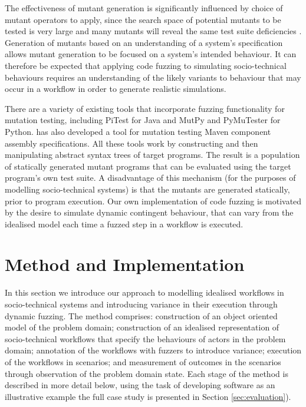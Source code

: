 \documentclass{sig-alternate}
\begin{document}
The effectiveness of mutant generation is significantly influenced by choice of
mutant operators to apply, since the search space of potential mutants to be
tested is very large and many mutants will reveal the same test suite
deficiencies \citep{takanen08fuzzing}.  Generation of mutants based on an
understanding of a system's specification allows mutant generation to be focused
on a system's intended behaviour.  It can therefore be expected that applying
code fuzzing to simulating socio-technical behaviours requires an understanding
of the likely variants to behaviour that may occur in a workflow in order to
generate realistic simulations.

There are a variety of existing tools that incorporate fuzzing functionality for
mutation testing, including PiTest \citep{coles14pitest} for Java and MutPy
\citep{mutpy26} and PyMuTester \citep{pymuttester} for Python.
\citet{storer15ringneck-repos} has also developed a tool for mutation testing
Maven component assembly specifications. All these tools work by constructing
and then manipulating abstract syntax trees of target programs.  The result is a
population of statically generated mutant programs that can be evaluated using
the target program's own test suite.  A disadvantage of this mechanism (for the
purposes of modelling socio-technical systems) is that the mutants are generated
statically, prior to program execution.  Our own implementation of code fuzzing
is motivated by the desire to simulate dynamic contingent behaviour, that can
vary from the idealised model each time a fuzzed step in a workflow is executed.



\section{Method and Implementation}
\label{sec:fuzzi-moss}


In this section we introduce our approach to modelling idealised workflows in
socio-technical systems and introducing variance in their execution through
dynamic fuzzing. The method comprises: construction of an object oriented model
of the problem domain; construction of an idealised representation of
socio-technical workflows that specify the behaviours of actors in the problem
domain; annotation of the workflows with fuzzers to introduce variance;
execution of the workflows in scenarios; and measurement of outcomes in the
scenarios through observation of the problem domain state. Each stage of the
method is described in more detail below, using the task of developing software
as an illustrative example the full case study is presented in Section
\ref{sec:evaluation}).
\end{document}
